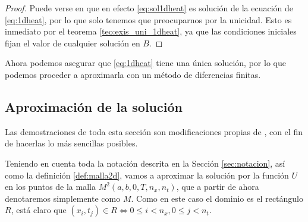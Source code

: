 \begin{proof}
	Puede verse en \cite[Secs. 6.1-2]{1dheat} que en efecto \eqref{eq:sol1dheat} es solución de la ecuación de \eqref{eq:1dheat}, por lo que solo tenemos que preocuparnos por la unicidad. Esto es inmediato por el teorema \ref{teo:exis_uni_1dheat}, ya que las condiciones iniciales fijan el valor de cualquier solución en $B$.
\end{proof}

Ahora podemos asegurar que \eqref{eq:1dheat} tiene una única solución, por lo que podemos proceder a aproximarla con un método de diferencias finitas.

\subsection{Aproximación de la solución}
Las demostraciones de toda esta sección son modificaciones propias de \cite{1dheat}, con el fin de hacerlas lo más sencillas posibles.

Teniendo en cuenta toda la notación descrita en la Sección \ref{sec:notacion}, así como la definición \ref{def:malla2d}, vamos a aproximar la solución por la función $U$ en los puntos de la malla $M^2(a,b,0,T,n_x,n_t)$, que a partir de ahora denotaremos simplemente como $M$. Como en este caso el dominio es el rectángulo $R$, está claro que $(x_i,t_j)\in R \iff 0\leq i < n_x, 0\leq j < n_t$. 


